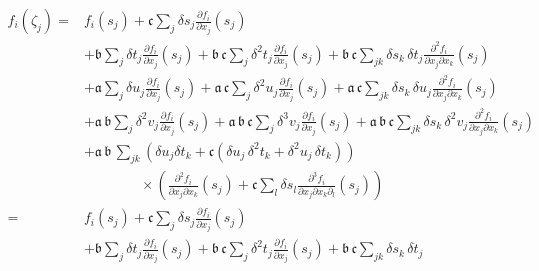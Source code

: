 \begin{align*}
f_{i} \! \left( \zeta_{j} \right)
%
=&
f_{i} \! \left( s_{j} \right) + \mathfrak{c} \sum_{j} \delta s_{j} 
\frac{ \partial f_{i} }{ \partial x_{j} } \! \left( s_{j} \right)
\\
&+ 
\mathfrak{b} \sum_{j} \delta t_{j} \frac{ \partial f_{i} }{ \partial x_{j} } \! \left( s_{j} \right)
+ \mathfrak{b} \, \mathfrak{c} \sum_{j} \delta^{2} t_{j} 
\frac{ \partial f_{i} }{ \partial x_{j} } \! \left( s_{j} \right) 
+ \mathfrak{b} \, \mathfrak{c} \sum_{jk} \delta s_{k} \, \delta t_{j} 
\frac{ \partial^{2} f_{i} }{ \partial x_{j} \partial x_{k} } \! \left( s_{j} \right)
\\
&+ 
\mathfrak{a} \sum_{j} \delta u_{j} \frac{ \partial f_{i} }{ \partial x_{j} } \! \left( s_{j} \right)
+ \mathfrak{a} \, \mathfrak{c} \sum_{j} \delta^{2} u_{j} 
\frac{ \partial f_{i} }{ \partial x_{j} } \! \left( s_{j} \right) 
+ \mathfrak{a} \, \mathfrak{c} \sum_{jk} \delta s_{k} \, \delta u_{j} 
\frac{ \partial^{2} f_{i} }{ \partial x_{j} \partial x_{k} } \! \left( s_{j} \right)
\\
&+ 
\mathfrak{a} \, \mathfrak{b} \sum_{j} \delta^{2} v_{j} 
\frac{ \partial f_{i} }{ \partial x_{j} } \! \left( s_{j} \right)
+ \mathfrak{a} \, \mathfrak{b} \, \mathfrak{c} \sum_{j} \delta^{3} v_{j} 
\frac{ \partial f_{i} }{ \partial x_{j} } \! \left( s_{j} \right) 
+ \mathfrak{a} \, \mathfrak{b} \, \mathfrak{c} \sum_{jk} \delta s_{k} \, \delta^{2} v_{j} 
\frac{ \partial^{2} f_{i} }{ \partial x_{j} \partial x_{k} } \! \left( s_{j} \right)
\\
&+ 
\mathfrak{a} \, \mathfrak{b} \, \sum_{jk} 
\left( \delta u_{j} \delta t_{k}
+ \mathfrak{c} \left(
\delta u_{j} \, \delta^{2} t_{k} + \delta^{2} u_{j} \, \delta t_{k} 
\right) \right)
\\
& \quad\quad\quad\quad \times \left(
\frac{ \partial^{2} f_{i} }{ \partial x_{j} \partial x_{k} } \! \left( s_{j} \right) 
+ \mathfrak{c} \sum_{l} \delta s_{l} 
\frac{ \partial^{3} f_{i} }{ \partial x_{j} \partial x_{k} \partial_{l} } \! \left( s_{j} \right)
\right)
\\
%
=&
f_{i} \! \left( s_{j} \right) + \mathfrak{c} \sum_{j} \delta s_{j} 
\frac{ \partial f_{i} }{ \partial x_{j} } \! \left( s_{j} \right)
\\
&+ 
\mathfrak{b} \sum_{j} \delta t_{j} \frac{ \partial f_{i} }{ \partial x_{j} } \! \left( s_{j} \right)
+ \mathfrak{b} \, \mathfrak{c} \sum_{j} \delta^{2} t_{j} 
\frac{ \partial f_{i} }{ \partial x_{j} } \! \left( s_{j} \right) 
+ \mathfrak{b} \, \mathfrak{c} \sum_{jk} \delta s_{k} \, \delta t_{j} 

\end{align*}
